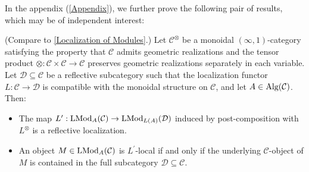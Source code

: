 \documentclass[10pt]{article}
\newcommand{\C}{\mathcal C}
\newcommand{\cD}{\mathcal{D}}
\theoremstyle{witharg}
\theoremstyle{witharg}
\theoremstyle{witharg2}
\begin{document}
\noindent In the appendix (\ref{Appendix}), we further prove the following pair of results, which may be of independent interest:



\begin{proposition}{}\label{Localization of Modules Intro}

    (Compare to \ref{Localization of Modules}.)  Let $\C^\otimes$ be a monoidal $(\infty,1)$-category satisfying the property that $\C$ admits geometric realizations and the tensor product $\otimes:\C\times \C\rightarrow \C$ preserves geometric realizations separately in each variable. Let $\cD\subseteq \C$ be a reflective subcategory such that the localization functor $L:\C\rightarrow \cD$ is compatible with the monoidal structure on $\C$, and let $A\in \textnormal{Alg}(\C)$. Then:

    \begin{itemize}
    
        \item [$(1)$] The map $L^\prime:\textnormal{LMod}_{A}(\C)\rightarrow \textnormal{LMod}_{L(A)}(\cD)$ induced by post-composition with $L^\otimes$ is a reflective localization. 

        
        \item [$(2)$] An object $M\in \textnormal{LMod}_{A}(\C)$ is $L^\prime$-local if and only if the underlying $\C$-object of $M$ is contained in the full subcategory $\cD\subseteq \C$.
        
    \end{itemize}
    
\end{proposition}
\end{document}
